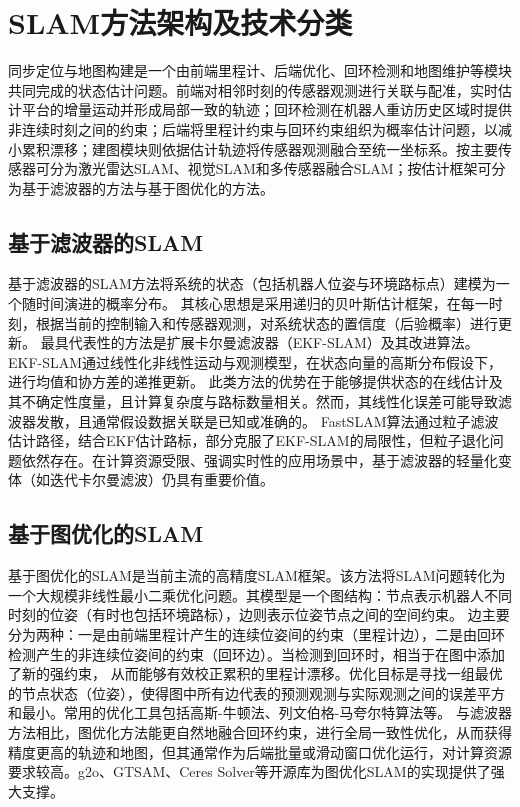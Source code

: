 \section{SLAM方法架构及技术分类}
同步定位与地图构建是一个由前端里程计、后端优化、回环检测和地图维护等模块共同完成的状态估计问题。前端对相邻时刻的传感器观测进行关联与配准，实时估计平台的增量运动并形成局部一致的轨迹；回环检测在机器人重访历史区域时提供非连续时刻之间的约束；后端将里程计约束与回环约束组织为概率估计问题，以减小累积漂移；建图模块则依据估计轨迹将传感器观测融合至统一坐标系。按主要传感器可分为激光雷达SLAM、视觉SLAM和多传感器融合SLAM；按估计框架可分为基于滤波器的方法与基于图优化的方法。

\subsection{基于滤波器的SLAM}
基于滤波器的SLAM方法将系统的状态（包括机器人位姿与环境路标点）建模为一个随时间演进的概率分布。
其核心思想是采用递归的贝叶斯估计框架，在每一时刻，根据当前的控制输入和传感器观测，对系统状态的置信度（后验概率）进行更新。
最具代表性的方法是扩展卡尔曼滤波器（EKF-SLAM）及其改进算法。EKF-SLAM通过线性化非线性运动与观测模型，在状态向量的高斯分布假设下，进行均值和协方差的递推更新。
此类方法的优势在于能够提供状态的在线估计及其不确定性度量，且计算复杂度与路标数量相关。然而，其线性化误差可能导致滤波器发散，且通常假设数据关联是已知或准确的。
FastSLAM算法通过粒子滤波估计路径，结合EKF估计路标，部分克服了EKF-SLAM的局限性，但粒子退化问题依然存在。在计算资源受限、强调实时性的应用场景中，基于滤波器的轻量化变体（如迭代卡尔曼滤波）仍具有重要价值。

\subsection{基于图优化的SLAM}
基于图优化的SLAM是当前主流的高精度SLAM框架。该方法将SLAM问题转化为一个大规模非线性最小二乘优化问题。其模型是一个图结构：节点表示机器人不同时刻的位姿（有时也包括环境路标），边则表示位姿节点之间的空间约束。
边主要分为两种：一是由前端里程计产生的连续位姿间的约束（里程计边），二是由回环检测产生的非连续位姿间的约束（回环边）。当检测到回环时，相当于在图中添加了新的强约束，
从而能够有效校正累积的里程计漂移。优化目标是寻找一组最优的节点状态（位姿），使得图中所有边代表的预测观测与实际观测之间的误差平方和最小。常用的优化工具包括高斯-牛顿法、列文伯格-马夸尔特算法等。
与滤波器方法相比，图优化方法能更自然地融合回环约束，进行全局一致性优化，从而获得精度更高的轨迹和地图，但其通常作为后端批量或滑动窗口优化运行，对计算资源要求较高。g2o、GTSAM、Ceres Solver等开源库为图优化SLAM的实现提供了强大支撑。


